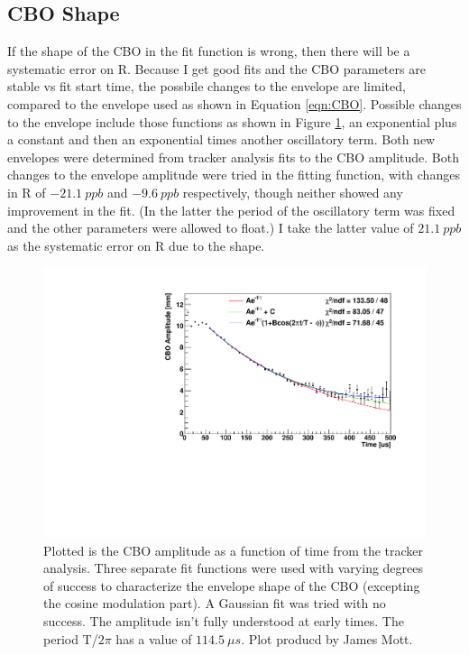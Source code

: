 	\subsection{CBO Shape}
	\label{SubSec:CBOShape}

		If the shape of the CBO in the fit function is wrong, then there will be a systematic error on R. Because I get good fits and the CBO parameters are stable vs fit start time, the possbile changes to the envelope are limited, compared to the envelope used as shown in Equation \ref{eqn:CBO}. Possible changes to the envelope include those functions as shown in Figure \ref{fig:CBOShapeAmplitude}, an exponential plus a constant and then an exponential times another oscillatory term. Both new envelopes were determined from tracker analysis fits to the CBO amplitude. Both changes to the envelope amplitude were tried in the fitting function, with changes in R of $\SI{-21.1}{ppb}$ and $\SI{-9.6}{ppb}$ respectively, though neither showed any improvement in the fit. (In the latter the period of the oscillatory term was fixed and the other parameters were allowed to float.) I take the latter value of $\SI{21.1}{ppb}$ as the systematic error on R due to the shape.

		\begin{figure}[]
			\centering
			\includegraphics[width=.7\textwidth]{AmplFitOptions}
		    \caption[CBOShapeAmplitude]{Plotted is the CBO amplitude as a function of time from the tracker analysis. Three separate fit functions were used with varying degrees of success to characterize the envelope shape of the CBO (excepting the cosine modulation part). A Gaussian fit was tried with no success. The amplitude isn't fully understood at early times. The period T/$2\pi$ has a value of $\SI{114.5}{\mu s}$. Plot producd by James Mott.}
		    \label{fig:CBOShapeAmplitude}
		\end{figure}

